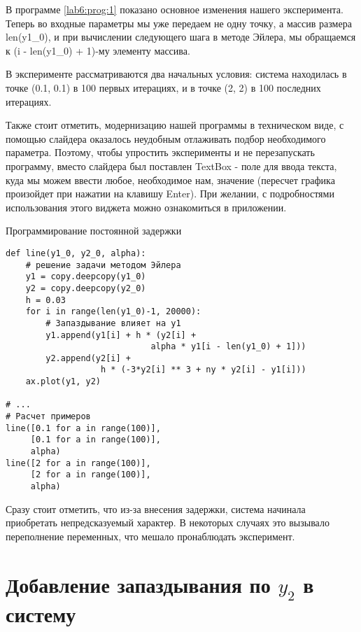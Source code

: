 В программе \ref{lab6:prog:1} показано основное изменения нашего
эксперимента. Теперь во входные параметры мы уже передаем не
одну точку, а массив размера len(y1\_0), и при вычислении следующего
шага в методе Эйлера, мы обращаемся к (i - len(y1\_0) + 1)-му элементу массива.

В эксперименте рассматриваются два начальных условия: система находилась
в точке (0.1, 0.1) в 100 первых итерациях, и в точке (2, 2) в 100 последних итерациях.

Также стоит отметить, модернизацию нашей программы в техническом виде,
с помощью слайдера оказалось неудобным отлаживать подбор необходимого параметра.
Поэтому, чтобы упростить эксперименты и не перезапускать программу, вместо
слайдера был поставлен \textmd{TextBox} - поле для ввода текста, куда мы
можем ввести любое, необходимое нам, значение (пересчет графика произойдет при нажатии на клавишу
\textmd{Enter}). При желании, с подробностями использования этого виджета можно ознакомиться
в приложении.

\begin{program}
    \caption{Программирование постоянной задержки}
    \label{lab6:prog:1}
    \begin{verbatim}
def line(y1_0, y2_0, alpha):
    # решение задачи методом Эйлера
    y1 = copy.deepcopy(y1_0)
    y2 = copy.deepcopy(y2_0)
    h = 0.03
    for i in range(len(y1_0)-1, 20000):
        # Запаздывание влияет на y1
        y1.append(y1[i] + h * (y2[i] +
                             alpha * y1[i - len(y1_0) + 1]))
        y2.append(y2[i] +
                   h * (-3*y2[i] ** 3 + ny * y2[i] - y1[i]))
    ax.plot(y1, y2)

# ...
# Расчет примеров
line([0.1 for a in range(100)],
     [0.1 for a in range(100)],
     alpha)
line([2 for a in range(100)],
     [2 for a in range(100)],
     alpha)
    \end{verbatim}
\end{program}

\clearpage

Сразу стоит отметить, что из-за внесения задержки, система начинала приобретать
непредсказуемый характер. В некоторых случаях это вызывало переполнение переменных,
что мешало пронаблюдать эксперимент.



\clearpage
\section{Добавление запаздывания по $y_2$ в систему}

